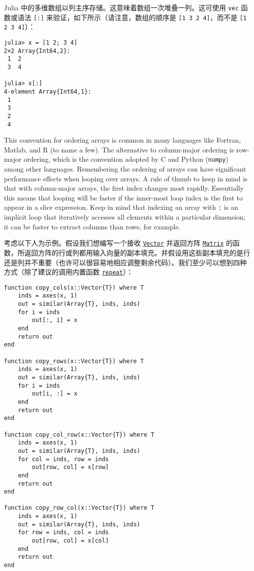 Julia 中的多维数组以列主序存储。这意味着数组一次堆叠一列。这可使用 \texttt{vec} 函数或语法 \texttt{[:]} 来验证，如下所示（请注意，数组的顺序是 \texttt{[1 3 2 4]}，而不是 \texttt{[1 2 3 4]}）：




\begin{verbatim}
julia> x = [1 2; 3 4]
2×2 Array{Int64,2}:
 1  2
 3  4

julia> x[:]
4-element Array{Int64,1}:
 1
 3
 2
 4
\end{verbatim}



This convention for ordering arrays is common in many languages like Fortran, Matlab, and R (to name a few). The alternative to column-major ordering is row-major ordering, which is the convention adopted by C and Python (\texttt{numpy}) among other languages. Remembering the ordering of arrays can have significant performance effects when looping over arrays. A rule of thumb to keep in mind is that with column-major arrays, the first index changes most rapidly. Essentially this means that looping will be faster if the inner-most loop index is the first to appear in a slice expression. Keep in mind that indexing an array with \texttt{:} is an implicit loop that iteratively accesses all elements within a particular dimension; it can be faster to extract columns than rows, for example.



考虑以下人为示例。假设我们想编写一个接收 \hyperlink{10571362059486397014}{\texttt{Vector}} 并返回方阵 \hyperlink{5448927444601277512}{\texttt{Matrix}} 的函数，所返回方阵的行或列都用输入向量的副本填充。并假设用这些副本填充的是行还是列并不重要（也许可以很容易地相应调整剩余代码）。我们至少可以想到四种方式（除了建议的调用内置函数 \hyperlink{15426606278434194584}{\texttt{repeat}}）：




\begin{verbatim}
function copy_cols(x::Vector{T}) where T
    inds = axes(x, 1)
    out = similar(Array{T}, inds, inds)
    for i = inds
        out[:, i] = x
    end
    return out
end

function copy_rows(x::Vector{T}) where T
    inds = axes(x, 1)
    out = similar(Array{T}, inds, inds)
    for i = inds
        out[i, :] = x
    end
    return out
end

function copy_col_row(x::Vector{T}) where T
    inds = axes(x, 1)
    out = similar(Array{T}, inds, inds)
    for col = inds, row = inds
        out[row, col] = x[row]
    end
    return out
end

function copy_row_col(x::Vector{T}) where T
    inds = axes(x, 1)
    out = similar(Array{T}, inds, inds)
    for row = inds, col = inds
        out[row, col] = x[col]
    end
    return out
end
\end{verbatim}




